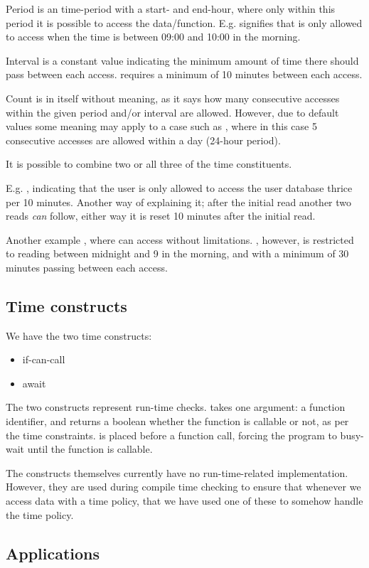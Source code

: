 Period is an time-period with a start- and end-hour, where only within this period it is possible to access the data/function.
E.g.  signifies that  is only allowed to access when the time is between 09:00 and 10:00 in the morning.

Interval is a constant value indicating the minimum amount of time there should pass between each access.
 requires a minimum of 10 minutes between each access.

Count is in itself without meaning, as it says how many consecutive accesses within the given period and/or interval are allowed.
However, due to default values some meaning may apply to a case such as , where in this case 5 consecutive accesses are allowed within a day (24-hour period).

It is possible to combine two or all three of the time constituents.

E.g. , indicating that the user is only allowed to access the user database thrice per 10 minutes.
Another way of explaining it; after the initial read another two reads \emph{can} follow, either way it is reset 10 minutes after the initial read.

Another example , where  can access without limitations.
, however, is restricted to reading between midnight and 9 in the morning, and with a minimum of 30 minutes passing between each access.

\subsection{Time constructs}
We have the two time constructs:

\begin{itemize}
  \item if-can-call 
  \item await 
\end{itemize}

The two constructs represent run-time checks.
 takes one argument: a function identifier, and returns a boolean whether the function is callable or not, as per the time constraints.
 is placed before a function call, forcing the program to busy-wait until the function is callable.

The constructs themselves currently have no run-time-related implementation.
However, they are used during compile time checking to ensure that whenever we access data with a time policy, that we have used one of these to somehow handle the time policy.

\subsection{Applications}
